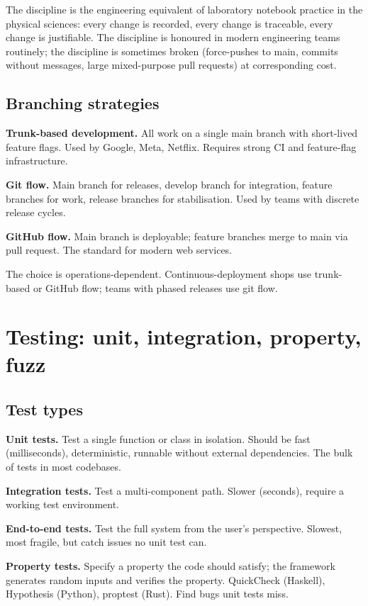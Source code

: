 The discipline is the engineering equivalent of laboratory notebook practice in the physical sciences: every change is recorded, every change is traceable, every change is justifiable. The discipline is honoured in modern engineering teams routinely; the discipline is sometimes broken (force-pushes to main, commits without messages, large mixed-purpose pull requests) at corresponding cost.

\subsection{Branching strategies}

\textbf{Trunk-based development.} All work on a single main branch with short-lived feature flags. Used by Google, Meta, Netflix. Requires strong CI and feature-flag infrastructure.

\textbf{Git flow.} Main branch for releases, develop branch for integration, feature branches for work, release branches for stabilisation. Used by teams with discrete release cycles.

\textbf{GitHub flow.} Main branch is deployable; feature branches merge to main via pull request. The standard for modern web services.

The choice is operations-dependent. Continuous-deployment shops use trunk-based or GitHub flow; teams with phased releases use git flow.

\section{Testing: unit, integration, property, fuzz}

\subsection{Test types}

\textbf{Unit tests.} Test a single function or class in isolation. Should be fast (milliseconds), deterministic, runnable without external dependencies. The bulk of tests in most codebases.

\textbf{Integration tests.} Test a multi-component path. Slower (seconds), require a working test environment.

\textbf{End-to-end tests.} Test the full system from the user's perspective. Slowest, most fragile, but catch issues no unit test can.

\textbf{Property tests.} Specify a property the code should satisfy; the framework generates random inputs and verifies the property. QuickCheck (Haskell), Hypothesis (Python), proptest (Rust). Find bugs unit tests miss.


